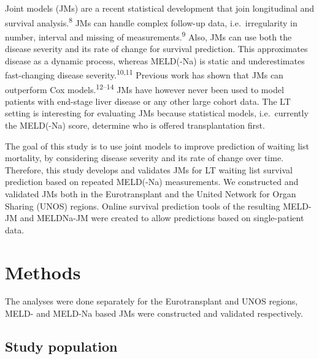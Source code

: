 \documentclass[11pt,english,]{book} %
\begin{document}
Joint models (JMs) are a recent statistical development that join longitudinal and survival analysis.\textsuperscript{8} JMs can handle complex follow-up data, i.e.~irregularity in number, interval and missing of measurements.\textsuperscript{9} Also, JMs can use both the disease severity and its rate of change for survival prediction. This approximates disease as a dynamic process, whereas MELD(-Na) is static and underestimates fast-changing disease severity.\textsuperscript{10,11} Previous work has shown that JMs can outperform Cox models.\textsuperscript{12--14} JMs have however never been used to model patients with end-stage liver disease or any other large cohort data. The LT setting is interesting for evaluating JMs because statistical models, i.e.~currently the MELD(-Na) score, determine who is offered transplantation first.

The goal of this study is to use joint models to improve prediction of waiting list mortality, by considering disease severity and its rate of change over time. Therefore, this study develops and validates JMs for LT waiting list survival prediction based on repeated MELD(-Na) measurements. We constructed and validated JMs both in the Eurotransplant and the United Network for Organ Sharing (UNOS) regions. Online survival prediction tools of the resulting MELD-JM and MELDNa-JM were created to allow predictions based on single-patient data.

\hypertarget{methods-2}{%
\section*{Methods}\label{methods-2}}

The analyses were done separately for the Eurotransplant and UNOS regions, MELD- and MELD-Na based JMs were constructed and validated respectively.

\hypertarget{study-population-1}{%
\subsection*{Study population}\label{study-population-1}}
\end{document}
